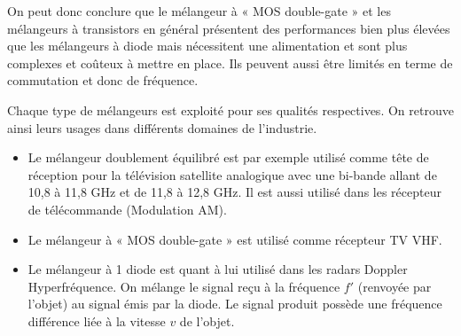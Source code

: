\documentclass{article}
\begin{document}
On peut donc conclure que le mélangeur à « MOS double-gate » et les mélangeurs à transistors en général présentent des performances bien plus élevées que les mélangeurs à diode mais nécessitent une alimentation et sont plus complexes et coûteux à mettre en place. Ils peuvent aussi être limités en terme de commutation et donc de fréquence.



Chaque type de mélangeurs est exploité pour ses qualités respectives. On retrouve ainsi leurs usages dans différents domaines de l'industrie.

\begin{itemize}
\item Le mélangeur doublement équilibré est par exemple utilisé comme tête de réception pour la télévision satellite analogique avec une bi-bande allant de 10,8 à 11,8 GHz et de 11,8 à 12,8 GHz.
Il est aussi utilisé dans les récepteur de télécommande (Modulation AM).
\item Le mélangeur à « MOS double-gate » est utilisé comme récepteur TV VHF.
\item Le mélangeur à 1 diode est quant à lui utilisé dans les radars Doppler Hyperfréquence. On mélange le signal reçu à la fréquence $f'$ (renvoyée par l'objet) au signal émis par la diode. Le signal produit possède une fréquence différence liée à la vitesse $v$ de l'objet. 
\end{itemize}
















%
%
%
%


%
%
%
%
\end{document}
